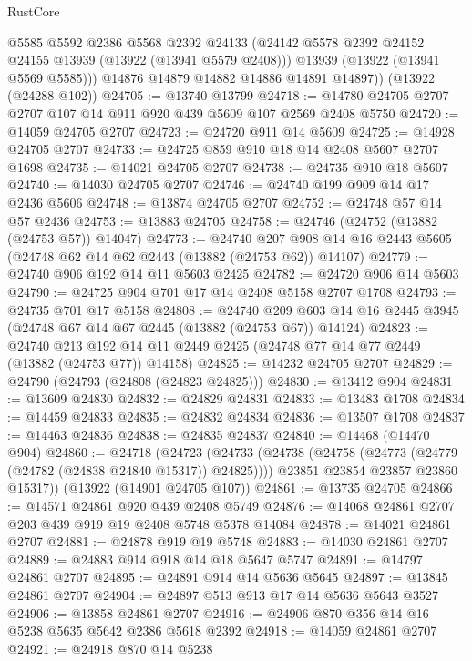 \begin{lexlean}{RustCore}
\begin{coremodule}
          @5585
          @5592
          @2386
          @5568
          @2392
          @24133
          (@24142 @5578 @2392 @24152 @24155 @13939 (@13922 (@13941 @5579 @2408)))
          @13939
          (@13922 (@13941 @5569 @5585)))
        @14876
        @14879
        @14882
        @14886
        @14891
        @14897))
    (@13922 (@24288 @102))
@24705 := @13740 @13799
@24718 := @14780 @24705 @2707 @2707 @107 @14 @911 @920 @439 @5609 @107 @2569 @2408 @5750
@24720 := @14059 @24705 @2707
@24723 := @24720 @911 @14 @5609
@24725 := @14928 @24705 @2707
@24733 := @24725 @859 @910 @18 @14 @2408 @5607 @2707 @1698
@24735 := @14021 @24705 @2707
@24738 := @24735 @910 @18 @5607
@24740 := @14030 @24705 @2707
@24746 := @24740 @199 @909 @14 @17 @2436 @5606
@24748 := @13874 @24705 @2707
@24752 := @24748 @57 @14 @57 @2436
@24753 := @13883 @24705
@24758 := @24746 (@24752 (@13882 (@24753 @57)) @14047)
@24773 := @24740
    @207
    @908
    @14
    @16
    @2443
    @5605
    (@24748 @62 @14 @62 @2443 (@13882 (@24753 @62)) @14107)
@24779 := @24740 @906 @192 @14 @11 @5603 @2425
@24782 := @24720 @906 @14 @5603
@24790 := @24725 @904 @701 @17 @14 @2408 @5158 @2707 @1708
@24793 := @24735 @701 @17 @5158
@24808 := @24740
    @209
    @603
    @14
    @16
    @2445
    @3945
    (@24748 @67 @14 @67 @2445 (@13882 (@24753 @67)) @14124)
@24823 := @24740
    @213
    @192
    @14
    @11
    @2449
    @2425
    (@24748 @77 @14 @77 @2449 (@13882 (@24753 @77)) @14158)
@24825 := @14232 @24705 @2707
@24829 := @24790 (@24793 (@24808 (@24823 @24825)))
@24830 := @13412 @904
@24831 := @13609 @24830
@24832 := @24829 @24831
@24833 := @13483 @1708
@24834 := @14459 @24833
@24835 := @24832 @24834
@24836 := @13507 @1708
@24837 := @14463 @24836
@24838 := @24835 @24837
@24840 := @14468 (@14470 @904)
@24860 := @24718
    (@24723
      (@24733
        (@24738 (@24758 (@24773 (@24779 (@24782 (@24838 @24840 @15317)) @24825))))
        @23851
        @23854
        @23857
        @23860
        @15317))
    (@13922 (@14901 @24705 @107))
@24861 := @13735 @24705
@24866 := @14571 @24861 @920 @439 @2408 @5749
@24876 := @14068 @24861 @2707 @203 @439 @919 @19 @2408 @5748 @5378 @14084
@24878 := @14021 @24861 @2707
@24881 := @24878 @919 @19 @5748
@24883 := @14030 @24861 @2707
@24889 := @24883 @914 @918 @14 @18 @5647 @5747
@24891 := @14797 @24861 @2707
@24895 := @24891 @914 @14 @5636 @5645
@24897 := @13845 @24861 @2707
@24904 := @24897 @513 @913 @17 @14 @5636 @5643 @3527
@24906 := @13858 @24861 @2707
@24916 := @24906 @870 @356 @14 @16 @5238 @5635 @5642 @2386 @5618 @2392
@24918 := @14059 @24861 @2707
@24921 := @24918 @870 @14 @5238

\end{coremodule}
\end{lexlean}
